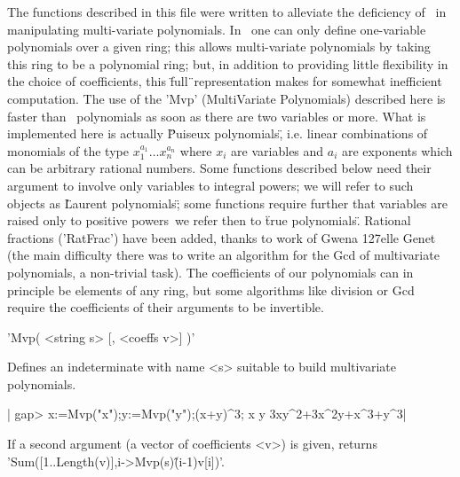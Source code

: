 \def\CHEVIE{{\sf CHEVIE}}

The  functions  described  in  this  file  were  written  to  alleviate the
deficiency of \GAP\ in manipulating multi-variate polynomials. In \GAP\ one
can  only define  one-variable polynomials  over a  given ring; this allows
multi-variate polynomials by taking this ring to be a polynomial ring; but,
in  addition to providing little flexibility in the choice of coefficients,
this  \"full\"\ representation makes  for somewhat inefficient computation.
The  use of the  'Mvp' (MultiVariate Polynomials)  described here is faster
than  \GAP\ polynomials as soon as there are two variables or more. What is
implemented   here  is   actually  \"Puiseux   polynomials\",  i.e.  linear
combinations  of monomials  of the  type $x_1^{a_1}\ldots  x_n^{a_n}$ where
$x_i$ are variables and $a_i$ are exponents which can be arbitrary rational
numbers. Some functions described below need their argument to involve only
variables  to integral powers;  we will refer  to such objects as \"Laurent
polynomials\";  some functions  require further  that variables  are raised
only  to positive powers\:\ we refer then to \"true polynomials\". Rational
fractions  ('RatFrac')  have  been  added,  thanks to work of Gwena{\accent
127e}lle Genet (the main difficulty there was to write an algorithm for the
Gcd  of multivariate polynomials, a  non-trivial task). The coefficients of
our  polynomials  can  in  principle  be  elements  of  any  ring, but some
algorithms like division or Gcd require the coefficients of their arguments
to be invertible.

%
%

'Mvp( <string s> [, <coeffs v>] )'

Defines an indeterminate with name <s> suitable to build multivariate
polynomials.

|    gap> x:=Mvp("x");y:=Mvp("y");(x+y)^3;
    x
    y
    3xy^2+3x^2y+x^3+y^3|

If a  second argument (a vector  of coefficients <v>) is  given, returns
'Sum([1..Length(v)],i->Mvp(s)\^(i-1)\*v[i])'.

